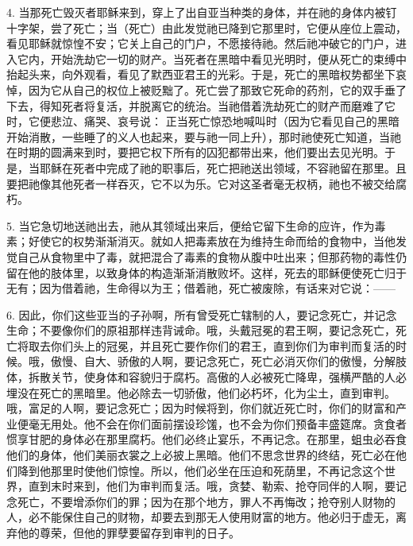 4. 当那死亡毁灭者耶稣来到，穿上了出自亚当种类的身体，并在祂的身体内被钉十字架，尝了死亡；当（死亡）由此发觉祂已降到它那里时，它便从座位上震动，看见耶稣就惊惶不安；它关上自己的门户，不愿接待祂。然后祂冲破它的门户，进入它内，开始洗劫它一切的财产。当死者在黑暗中看见光明时，便从死亡的束缚中抬起头来，向外观看，看见了默西亚君王的光彩。于是，死亡的黑暗权势都坐下哀悼，因为它从自己的权位上被贬黜了。死亡尝了那致它死命的药剂，它的双手垂了下去，得知死者将复活，并脱离它的统治。当祂借着洗劫死亡的财产而磨难了它时，它便悲泣、痛哭、哀号说： 正当死亡惊恐地喊叫时（因为它看见自己的黑暗开始消散，一些睡了的义人也起来，要与祂一同上升），那时祂使死亡知道，当祂在时期的圆满来到时，要把它权下所有的囚犯都带出来，他们要出去见光明。于是，当耶稣在死者中完成了祂的职事后，死亡把祂送出领域，不容祂留在那里。且要把祂像其他死者一样吞灭，它不以为乐。它对这圣者毫无权柄，祂也不被交给腐朽。\par

5. 当它急切地送祂出去，祂从其领域出来后，便给它留下生命的应许，作为毒素；好使它的权势渐渐消灭。就如人把毒素放在为维持生命而给的食物中，当他发觉自己从食物里中了毒，就把混合了毒素的食物从腹中吐出来；但那药物的毒性仍留在他的肢体里，以致身体的构造渐渐消散败坏。这样，死去的耶稣便使死亡归于无有；因为借着祂，生命得以为王；借着祂，死亡被废除，有话来对它说：—— \par

6. 因此，你们这些亚当的子孙啊，所有曾受死亡辖制的人，要记念死亡，并记念生命；不要像你们的原祖那样违背诫命。哦，头戴冠冕的君王啊，要记念死亡，死亡将取去你们头上的冠冕，并且死亡要作你们的君王，直到你们为审判而复活的时候。哦，傲慢、自大、骄傲的人啊，要记念死亡，死亡必消灭你们的傲慢，分解肢体，拆散关节，使身体和容貌归于腐朽。高傲的人必被死亡降卑，强横严酷的人必埋没在死亡的黑暗里。他必除去一切骄傲，他们必朽坏，化为尘土，直到审判。哦，富足的人啊，要记念死亡；因为时候将到，你们就近死亡时，你们的财富和产业便毫无用处。他不会在你们面前摆设珍馐，也不会为你们预备丰盛筵席。贪食者惯享甘肥的身体必在那里腐朽。他们必终止宴乐，不再记念。在那里，蛆虫必吞食他们的身体，他们美丽衣裳之上必披上黑暗。他们不思念世界的终结，死亡必在他们降到他那里时使他们惊惶。所以，他们必坐在压迫和死荫里，不再记念这个世界，直到末时来到，他们为审判而复活。哦，贪婪、勒索、抢夺同伴的人啊，要记念死亡，不要增添你们的罪；因为在那个地方，罪人不再悔改；抢夺别人财物的人，必不能保住自己的财物，却要去到那无人使用财富的地方。他必归于虚无，离弃他的尊荣，但他的罪孽要留存到审判的日子。\par

